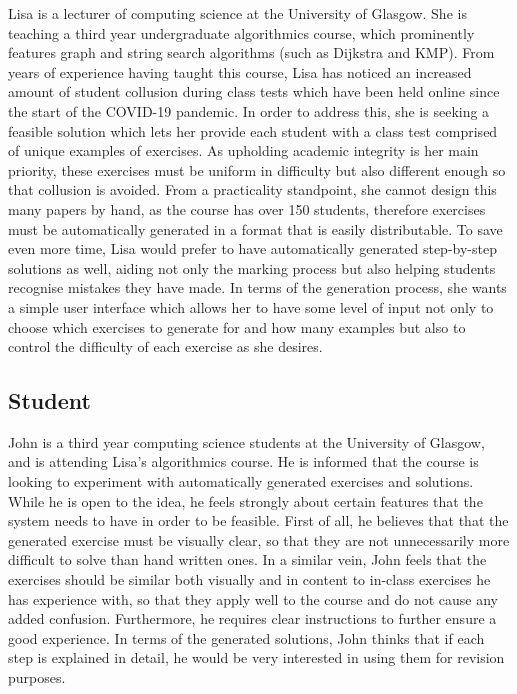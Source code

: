\documentclass{l4proj}
\begin{document}
Lisa is a lecturer of computing science at the University of Glasgow. She is teaching a third year undergraduate algorithmics course, which prominently features graph and string search algorithms (such as Dijkstra and KMP). From years of experience having taught this course, Lisa has noticed an increased amount of student collusion during class tests which have been held online since the start of the COVID-19 pandemic. In order to address this, she is seeking a feasible solution which lets her provide each student with a class test comprised of unique examples of exercises. As upholding academic integrity is her main priority, these exercises must be uniform in difficulty but also different enough so that collusion is avoided. From a practicality standpoint, she cannot design this many papers by hand, as the course has over 150 students, therefore exercises must be automatically generated in a format that is easily distributable. To save even more time, Lisa would prefer to have automatically generated step-by-step solutions as well, aiding not only the marking process but also helping students recognise mistakes they have made. In terms of the generation process, she wants a simple user interface which allows her to have some level of input not only to choose which exercises to generate for and how many examples but also to control the difficulty of each exercise as she desires.

\subsection{Student}

John is a third year computing science students at the University of Glasgow, and is attending Lisa's algorithmics course. He is informed that the course is looking to experiment with automatically generated exercises and solutions. While he is open to the idea, he feels strongly about certain features that the system needs to have in order to be feasible. First of all, he believes that that the generated exercise must be visually clear, so that they are not unnecessarily more difficult to solve than hand written ones. In a similar vein, John feels that the exercises should be similar both visually and in content to in-class exercises he has experience with, so that they apply well to the course and do not cause any added confusion. Furthermore, he requires clear instructions to further ensure a good experience. In terms of the generated solutions, John thinks that if each step is explained in detail, he would be very interested in using them for revision purposes.
\end{document}
